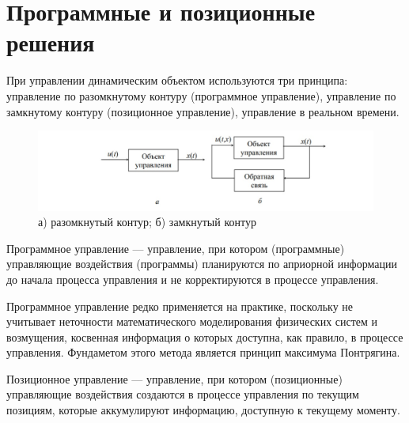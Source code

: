 \section{Программные и позиционные решения}\label{1sec:Solution}

При управлении динамическим объектом используются три принципа: управление по разомкнутому контуру (программное управление), управление по замкнутому контуру (позиционное управление), управление в реальном времени.

\begin{figure}[h]

\centering

\includegraphics[width=\linewidth]{image1.jpg}

\caption{а) разомкнутый контур; б) замкнутый контур}

\label{fig:mpr}

\end{figure}

\begin{definition} 
Программное управление — управление, при котором (программные) управляющие воздействия (программы) планируются по априорной информации до начала процесса управления и не корректируются в процессе управления. 
\end{definition}

Программное управление редко применяется на практике, поскольку не учитывает неточности математического моделирования физических систем и возмущения, косвенная информация о которых доступна, как правило, в процессе управления. Фундаметом этого метода является принцип максимума Понтрягина. 

\begin{definition} 
Позиционное управление — управление, при котором (позиционные) управляющие воздействия создаются в процессе управления по текущим позициям, которые аккумулируют информацию, доступную к текущему моменту.
\end{definition}


